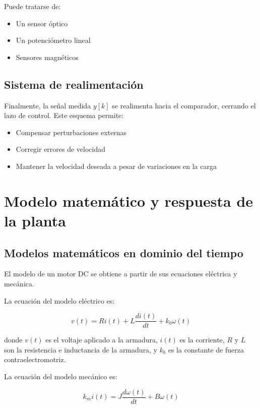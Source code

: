 \documentclass[letter,12pt]{article}
\begin{document}
Puede tratarse de:
\begin{itemize}
	\item Un sensor óptico
	\item Un potenciómetro lineal
	\item Sensores magnéticos
\end{itemize}

\subsection{Sistema de realimentación}

Finalmente, la señal medida $y[k]$ se realimenta hacia el comparador, cerrando el lazo de control.  
Este esquema permite:
\begin{itemize}
	\item Compensar perturbaciones externas
	\item Corregir errores de velocidad
	\item Mantener la velocidad deseada a pesar de variaciones en la carga
\end{itemize}

\section{Modelo matemático y respuesta de la planta}


\subsection{Modelos matemáticos en dominio del tiempo}

El modelo de un motor DC se obtiene a partir de sus ecuaciones eléctrica y mecánica.


La ecuación del modelo eléctrico es:

\begin{equation}
	v(t) = Ri(t) + L \frac{di(t)}{dt} + k_b\omega(t)
	\label{eq:mod_elec}
\end{equation}

donde $v(t)$ es el voltaje aplicado a la armadura, $i(t)$ es la corriente, $R$ y $L$ son la resistencia e inductancia de la armadura, y $k_b$ es la constante de fuerza contraelectromotriz.


La ecuación del modelo mecánico es:

\begin{equation}
	k_mi(t) = J \frac{d\omega(t)}{dt} + B\omega(t)
	\label{eq:mod_meca}
\end{equation}
\end{document}
